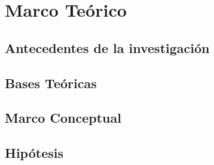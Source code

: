 \chapter{Marco Teórico}
\section{Antecedentes de la investigación}


\section{Bases Teóricas}


\section{Marco Conceptual}


\section{Hipótesis}

